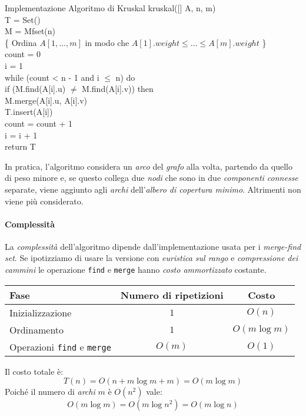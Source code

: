 \begin{minicode}{Implementazione Algoritmo di Kruskal}
\ind{} kruskal([] A,  n,  m)\\
     T = Set()\\
     M = Mfset(n)\\
    \{ Ordina $A[1,\dots,m]$ in modo che $A[1].weight\leq\dots\leq A[m].weight$ \}\\
     count = 0\\
     i = 1\\
    \indf while (count < n - 1 and i $\leq$ n) do\\
        \indff if (M.find(A[i].u) $\neq$ M.find(A[i].v)) then\\
            M.merge(A[i].u, A[i].v)\\
            T.insert(A[i])\\
            count = count + 1\\
        \indff i = i + 1\\
    \indf return T
\end{minicode}

\noindent
In pratica, l'algoritmo considera un \emph{arco} del \emph{grafo} alla volta,
partendo da quello di peso minore e, se questo collega due \emph{nodi} che sono
in due \emph{componenti connesse} separate, viene aggiunto agli \emph{archi}
dell'\emph{albero di copertura minimo}. Altrimenti non viene più considerato.

\paragraph{Complessità}
La \emph{complessità} dell'algoritmo dipende dall'implementazione usata per i
\emph{merge-find set}. Se ipotizziamo di usare la versione con \emph{euristica
sul rango} e \emph{compressione dei cammini} le operazione \texttt{find} e
\texttt{merge} hanno \emph{costo ammortizzato} costante.

\begin{table}[h!]
    \centering
    \renewcommand{\arraystretch}{1.2}
    \begin{tabular}{|l|c|c|}
        \hline
        \textbf{Fase} & \textbf{Numero di ripetizioni} & \textbf{Costo}\\
        \hline
        Inizializzazione & $1$ & $O(n)$\\
        \hline
        Ordinamento & $1$ & $O(m\log m)$\\
        \hline
        Operazioni \texttt{find} e \texttt{merge} & $O(m)$ & $O(1)$\\
        \hline
    \end{tabular}
\end{table}\noindent
Il costo totale è:
\[T(n)=O(n+m\log m+m)=O(m\log m)\]
Poiché il numero di \emph{archi} $m$ è $O(n^2)$ vale:
\[O(m\log m)=O(m\log n^2)=O(m\log n)\]

